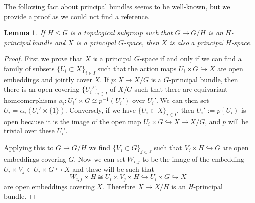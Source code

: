 \documentclass{amsart}
\theoremstyle{plain}
\newtheorem{lem}[thm]{Lemma}
\theoremstyle{definition}
\begin{document}
The following fact about principal bundles seems to be well-known, but we provide a proof as we could not find a reference.
\begin{lem}\label{lem:principal-bundle-subgroup}
    If $H \le G$ is a topological subgroup such that $G \to G/H$ is an $H$-principal bundle and $X$ is a principal $G$-space, then $X$ is also a principal $H$-space.
\end{lem}
\begin{proof}
    First we prove that $X$ is a principal $G$-space if and only if we can find a family of subsets $\{U_i \subset X\}_{i \in I}$ such that the action maps $U_i \times G \hookrightarrow X$ are open embeddings and jointly cover $X$.
    If $p\colon X \to X/G$ is a $G$-principal bundle, then there is an open covering $\{U_i'\}_{i \in I}$ of $X/G$ such that there are equivariant homeomorphisms $\alpha_i\colon U_i' \times G \cong p^{-1}(U_i')$ over $U_i'$. We can then set $U_i = \alpha_i(U_i' \times \{1\})$.
    Conversely, if we have $\{U_i \subset X\}_{i\in I}$, then $U_i' := p(U_i)$ is open because it is the image of the open map $U_i \times G \hookrightarrow X \to X/G$, and $p$ will be trivial over these $U_i'$.

    Applying this to $G \to G/H$ we find $\{V_j \subset G\}_{j \in J}$ such that $V_j \times H \hookrightarrow G$ are open embeddings covering $G$.
    Now we can set $W_{i,j}$ to be the image of the embedding $U_i \times V_j \subset U_i \times G \hookrightarrow X$ and these will be such that 
    \[
        W_{i,j} \times H \cong U_i \times V_j \times H
        \hookrightarrow U_i \times G \hookrightarrow X
    \]
    are open embeddings covering $X$.
    Therefore $X \to X/H$ is an $H$-principal bundle.
\end{proof}
\end{document}
